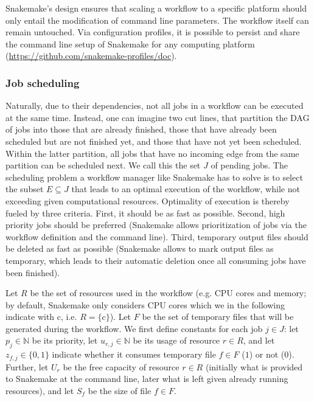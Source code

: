 \documentclass[parskip=half]{scrartcl}
\let\plainurl\url
\renewcommand{\url}[1]{\protect\plainurl{#1}}
\begin{document}
Snakemake's design ensures that scaling a workflow to a specific platform should only entail the modification of command line parameters.
The workflow itself can remain untouched.
Via configuration profiles, it is possible to persist and share the command line setup of Snakemake for any computing platform (\url{https://github.com/snakemake-profiles/doc}).

\subsubsection{Job scheduling}

Naturally, due to their dependencies, not all jobs in a workflow can be executed at the same time.
Instead, one can imagine two cut lines, that partition the DAG of jobs into those that are already finished, those that have already been scheduled but are not finished yet, and those that have not yet been scheduled.
Within the latter partition, all jobs that have no incoming edge from the same partition can be scheduled next.
We call this the set $J$ of pending jobs.
The scheduling problem a workflow manager like Snakemake has to solve is to select the subset $E \subseteq J$ that leads to an optimal execution of the workflow, while not exceeding given computational resources.
Optimality of execution is thereby fueled by three criteria.
First, it should be as fast as possible.
Second, high priority jobs should be preferred (Snakemake allows prioritization of jobs via the workflow definition and the command line).
Third, temporary output files should be deleted as fast as possible (Snakemake allows to mark output files as temporary, which leads to their automatic deletion once all consuming jobs have been finished).

\newcommand{\N}{\mathbb{N}}
\newcommand{\cores}{\text{c}}

Let $R$ be the set of resources used in the workflow (e.g. CPU cores and memory; by default, Snakemake only considers CPU cores which we in the following indicate with $\cores$, i.e. $R = \{\cores\}$).
Let $F$ be the set of temporary files that will be generated during the workflow.
We first define constants for each job $j \in J$: let $p_j \in \N$ be its priority, let $u_{r,j} \in \N$ be its usage of resource $r \in R$, and let $z_{f,j} \in \{0,1\}$ indicate whether it consumes temporary file $f \in F$ ($1$) or not ($0$).
Further, let $U_r$ be the free capacity of resource $r \in R$ (initially what is provided to Snakemake at the command line, later what is left given already running resources), and let $S_f$ be the size of file $f \in F$.
\end{document}
